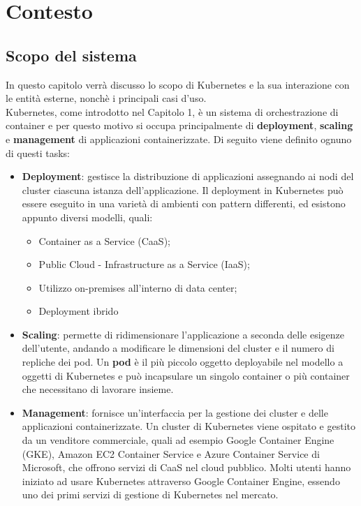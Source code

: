 \documentclass[12pt, a4paper]{report}
\begin{document}
\chapter{Contesto}
\section{Scopo del sistema}
In questo capitolo verrà discusso lo scopo di Kubernetes e la sua interazione con le entità esterne, nonchè i principali casi d'uso. \\
Kubernetes, come introdotto nel Capitolo 1, è un sistema di orchestrazione di container e per questo motivo si occupa principalmente di \textbf{deployment}, \textbf{scaling} e \textbf{management} di applicazioni containerizzate. Di seguito viene definito ognuno di questi tasks:
\begin{itemize}
\item \textbf{Deployment}: gestisce la distribuzione di applicazioni assegnando ai nodi del cluster ciascuna istanza dell'applicazione. Il deployment in Kubernetes può essere eseguito in una varietà di ambienti con pattern differenti, ed esistono appunto diversi modelli, quali:
\begin{itemize}
  \item Container as a Service (CaaS);
  \item Public Cloud - Infrastructure as a Service (IaaS);
  \item Utilizzo on-premises all'interno di data center;
  \item Deployment ibrido
\end{itemize}
\item \textbf{Scaling}: permette di ridimensionare l'applicazione a seconda delle esigenze dell'utente, andando a modificare le dimensioni del cluster e il numero di repliche dei pod. Un \textbf{pod} è il più piccolo oggetto deployabile nel modello a oggetti di Kubernetes e può incapsulare un singolo container o più container che necessitano di lavorare insieme.
\item \textbf{Management}: fornisce un'interfaccia per la gestione dei cluster e delle applicazioni containerizzate. Un cluster di Kubernetes viene ospitato e gestito da un venditore commerciale, quali ad esempio Google Container Engine (GKE), Amazon EC2 Container Service e Azure Container Service di Microsoft, che offrono servizi di CaaS nel cloud pubblico. Molti utenti hanno iniziato ad usare Kubernetes attraverso Google Container Engine, essendo uno dei primi servizi di gestione di Kubernetes nel mercato.
\end{itemize}
\end{document}
